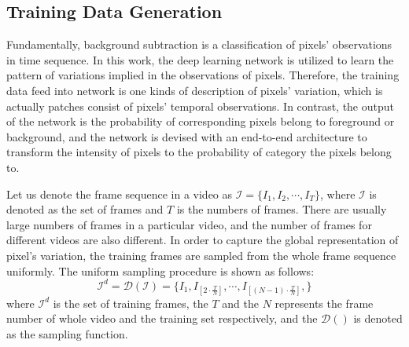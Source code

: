\documentclass[journal]{IEEEtran}
\begin{document}
\subsection*{Training Data Generation}
Fundamentally, 
background subtraction is a classification of pixels' observations in time sequence.
In this work,
the deep learning network is utilized to learn the pattern of variations implied in the observations of pixels.
Therefore,
the training data feed into network is one kinds of description of pixels' variation,
which is actually patches consist of pixels' temporal observations.
%
In contrast, the output of the network is the probability of corresponding pixels belong to foreground or background,
and the network is devised with an end-to-end architecture to transform the intensity of pixels to the probability of category the pixels belong to.

Let us denote the frame sequence in a video as $\mathcal{I} = \{I_1, I_2, \cdots, I_T\}$,
where $\mathcal{I}$ is denoted as the set of frames and $T$ is the numbers of frames.
%
There are usually large numbers of frames in a particular video,
and the number of frames for different videos are also different.
%
In order to capture the global representation of pixel's variation,
the training frames are sampled from the whole frame sequence uniformly.
%
%
The uniform sampling procedure is shown as follows:
% 
% 
\begin{equation}
    \mathcal{I}^d = \mathcal{D}(\mathcal{I})=  \{I_1, I_{[2 \cdot \frac{T}{N}]}, \cdots, I_{[(N - 1) \cdot \frac{T}{N}]}, \}
\end{equation}
where $\mathcal{I}^d$ is the set of training frames,
the $T$ and the $N$ represents the frame number of whole video and the training set respectively,
and the $\mathcal{D}()$ is denoted as the sampling function.
% 
% 
% 
% 
% 
\end{document}
